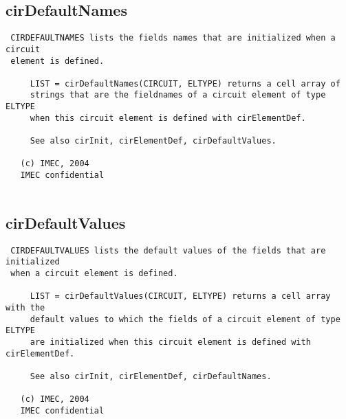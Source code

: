 \newpage
\subsection{cirDefaultNames}
\label{sec:cirDefaultNames}
\begin{verbatim}
 CIRDEFAULTNAMES lists the fields names that are initialized when a circuit 
 element is defined.
 
     LIST = cirDefaultNames(CIRCUIT, ELTYPE) returns a cell array of
     strings that are the fieldnames of a circuit element of type ELTYPE
     when this circuit element is defined with cirElementDef.
 
     See also cirInit, cirElementDef, cirDefaultValues. 
 
   (c) IMEC, 2004
   IMEC confidential 
 

\end{verbatim}

\newpage
\subsection{cirDefaultValues}
\label{sec:cirDefaultValues}
\begin{verbatim}
 CIRDEFAULTVALUES lists the default values of the fields that are initialized 
 when a circuit element is defined.
 
     LIST = cirDefaultValues(CIRCUIT, ELTYPE) returns a cell array with the
     default values to which the fields of a circuit element of type ELTYPE
     are initialized when this circuit element is defined with cirElementDef.
 
     See also cirInit, cirElementDef, cirDefaultNames. 
 
   (c) IMEC, 2004
   IMEC confidential 
 

\end{verbatim}

\newpage
